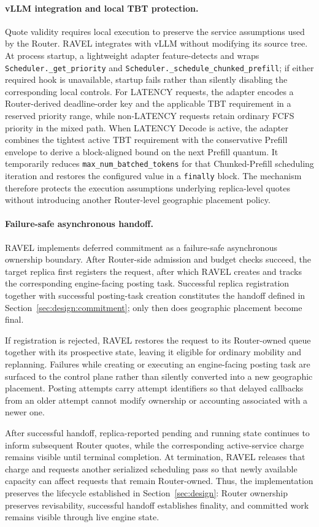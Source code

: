\paragraph{vLLM integration and local TBT protection.}
Quote validity requires local execution to preserve the service assumptions
used by the Router.
RAVEL integrates with vLLM without modifying its source tree.
At process startup, a lightweight adapter feature-detects and wraps
\texttt{Scheduler.\_get\_priority} and
\texttt{Scheduler.\_schedule\_chunked\_prefill}; if either required hook is
unavailable, startup fails rather than silently disabling the corresponding
local controls.
For LATENCY requests, the adapter encodes a Router-derived deadline-order key
and the applicable TBT requirement in a reserved priority range, while
non-LATENCY requests retain ordinary FCFS priority in the mixed path.
When LATENCY Decode is active, the adapter combines the tightest active TBT
requirement with the conservative Prefill envelope to derive a block-aligned
bound on the next Prefill quantum.
It temporarily reduces \texttt{max\_num\_batched\_tokens} for that
Chunked-Prefill scheduling iteration and restores the configured value in a
\texttt{finally} block.
The mechanism therefore protects the execution assumptions underlying
replica-level quotes without introducing another Router-level geographic
placement policy.

\paragraph{Failure-safe asynchronous handoff.}
RAVEL implements deferred commitment as a failure-safe asynchronous ownership
boundary.
After Router-side admission and budget checks succeed, the target replica first
registers the request, after which RAVEL creates and tracks the corresponding
engine-facing posting task.
Successful replica registration together with successful posting-task creation
constitutes the handoff defined in
Section~\ref{sec:design:commitment}; only then does geographic placement become
final.

If registration is rejected, RAVEL restores the request to its Router-owned
queue together with its prospective state, leaving it eligible for ordinary
mobility and replanning.
Failures while creating or executing an engine-facing posting task are surfaced
to the control plane rather than silently converted into a new geographic
placement.
Posting attempts carry attempt identifiers so that delayed callbacks from an
older attempt cannot modify ownership or accounting associated with a newer
one.

After successful handoff, replica-reported pending and running state continues
to inform subsequent Router quotes, while the corresponding active-service
charge remains visible until terminal completion.
At termination, RAVEL releases that charge and requests another serialized
scheduling pass so that newly available capacity can affect requests that remain
Router-owned.
Thus, the implementation preserves the lifecycle established in
Section~\ref{sec:design}: Router ownership preserves revisability, successful
handoff establishes finality, and committed work remains visible through live
engine state.
